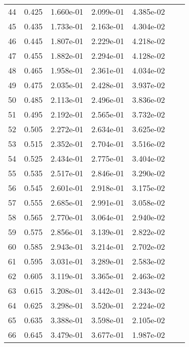\begin{table}[ht]
\begin{tabular}{rcccccc}
    44 &  0.425 &       1.660e-01 &       2.099e-01  &        4.385e-02\\ 
    45 &  0.435 &       1.733e-01 &       2.163e-01  &        4.304e-02\\ 
    46 &  0.445 &       1.807e-01 &       2.229e-01  &        4.218e-02\\ 
    47 &  0.455 &       1.882e-01 &       2.294e-01  &        4.128e-02\\ 
    48 &  0.465 &       1.958e-01 &       2.361e-01  &        4.034e-02\\ 
    49 &  0.475 &       2.035e-01 &       2.428e-01  &        3.937e-02\\ 
    50 &  0.485 &       2.113e-01 &       2.496e-01  &        3.836e-02\\ 
    51 &  0.495 &       2.192e-01 &       2.565e-01  &        3.732e-02\\ 
    52 &  0.505 &       2.272e-01 &       2.634e-01  &        3.625e-02\\ 
    53 &  0.515 &       2.352e-01 &       2.704e-01  &        3.516e-02\\ 
    54 &  0.525 &       2.434e-01 &       2.775e-01  &        3.404e-02\\ 
    55 &  0.535 &       2.517e-01 &       2.846e-01  &        3.290e-02\\ 
    56 &  0.545 &       2.601e-01 &       2.918e-01  &        3.175e-02\\ 
    57 &  0.555 &       2.685e-01 &       2.991e-01  &        3.058e-02\\ 
    58 &  0.565 &       2.770e-01 &       3.064e-01  &        2.940e-02\\ 
    59 &  0.575 &       2.856e-01 &       3.139e-01  &        2.822e-02\\ 
    60 &  0.585 &       2.943e-01 &       3.214e-01  &        2.702e-02\\ 
    61 &  0.595 &       3.031e-01 &       3.289e-01  &        2.583e-02\\ 
    62 &  0.605 &       3.119e-01 &       3.365e-01  &        2.463e-02\\ 
    63 &  0.615 &       3.208e-01 &       3.442e-01  &        2.343e-02\\ 
    64 &  0.625 &       3.298e-01 &       3.520e-01  &        2.224e-02\\ 
    65 &  0.635 &       3.388e-01 &       3.598e-01  &        2.105e-02\\ 
    66 &  0.645 &       3.479e-01 &       3.677e-01  &        1.987e-02\\ 

\end{tabular}
\end{table}
